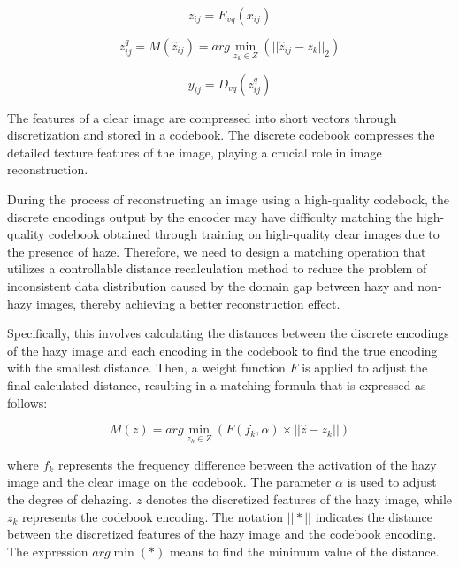 \documentclass[journal]{IEEEtran}
\begin{document}
\begin{equation}
	\label{vq_equation_1}
	z_{ij} = E_{vq}(x_{ij})
\end{equation}

\begin{equation}
	\label{vq_equation_2}
	z_{ij}^{q} = M(\widehat{z}_{ij}) = arg \min_{z_{k} \in Z} (|| \widehat{z}_{ij} - z_{k} ||_{2})
\end{equation}

\begin{equation}
	\label{vq_equation_3}
	y_{ij} = D_{vq}(z_{ij}^{q})
\end{equation}

The features of a clear image are compressed into short vectors through discretization and stored in a codebook. The discrete codebook compresses the detailed texture features of the image, playing a crucial role in image reconstruction.

During the process of reconstructing an image using a high-quality codebook, the discrete encodings output by the encoder may have difficulty matching the high-quality codebook obtained through training on high-quality clear images due to the presence of haze. Therefore, we need to design a matching operation that utilizes a controllable distance recalculation method to reduce the problem of inconsistent data distribution caused by the domain gap between hazy and non-hazy images, thereby achieving a better reconstruction effect.

Specifically, this involves calculating the distances between the discrete encodings of the hazy image and each encoding in the codebook to find the true encoding with the smallest distance. Then, a weight function $F$ is applied to adjust the final calculated distance, resulting in a matching formula that is expressed as follows:

\begin{equation}
	\label{codebook_matching_equation_2}
	M(z) = arg \min_{z_{k} \in Z} (F(f_{k}, \alpha) \times || \widehat{z} - z_{k} ||)
\end{equation}

\noindent where $f_{k}$ represents the frequency difference between the activation of the hazy image and the clear image on the codebook. The parameter $ \alpha $ is used to adjust the degree of dehazing. $z$ denotes the discretized features of the hazy image, while $z_{k}$ represents the codebook encoding. The notation $||*||$ indicates the distance between the discretized features of the hazy image and the codebook encoding. The expression $arg \min(*)$ means to find the minimum value of the distance.
\end{document}
